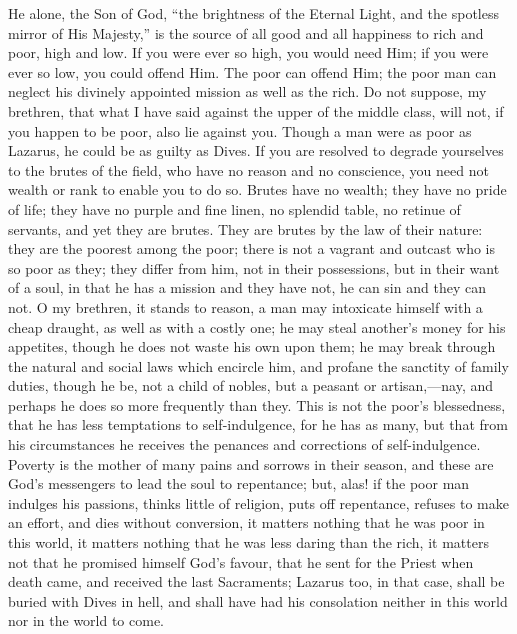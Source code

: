He alone, the Son of God, ``the brightness of the Eternal
Light, and the spotless mirror of His Majesty,'' is the source of
all good and all happiness to rich and poor, high and low. If you were
ever so high, you would need Him; if you were ever so low, you could
offend Him. The poor can offend Him; the poor man can neglect his
divinely appointed mission as well as the rich. Do not suppose, my
brethren, that what I have said against the upper of the middle class,
will not, if you happen to be poor, also lie against you. Though a man
were as poor as Lazarus, he could be as guilty as Dives. If you are
resolved to degrade yourselves to the brutes of the field, who have no
reason and no conscience, you need not wealth or rank to enable you to
do so. Brutes have no wealth; they have no pride of life; they have no
purple and fine linen, no splendid table, no retinue of servants, and
yet they are brutes. They are brutes by the law of their nature: they
are the poorest among the poor; there is not a vagrant and outcast who
is so poor as they; they differ from him, not in their possessions,
but in their want of a soul, in that he has a mission and they have
not, he can sin and they can not. O my brethren, it stands to reason,
a man may intoxicate himself with a cheap draught, as well as with a
costly one; he may steal another's money for his appetites, though he
does not waste his own upon them; he may break through the natural and
social laws which encircle him, and profane the sanctity of family
duties, though he be, not a child of nobles, but a peasant or artisan,—nay,
and perhaps he does so more frequently than they. This is not the
poor's blessedness, that he has less temptations to self-indulgence,
for he has as many, but that from his circumstances he receives the
penances and corrections of self-indulgence. Poverty is the mother of
many pains and sorrows in their season, and these are God's messengers
to lead the soul to repentance; but, alas! if the poor man indulges
his passions, thinks little of religion, puts off repentance, refuses
to make an effort, and dies without conversion, it matters nothing
that he was poor in this world, it matters nothing that he was less
daring than the rich, it matters not that he promised himself God's
favour, that he sent for the Priest when death came, and received the
last Sacraments; Lazarus too, in that case, shall be buried with Dives
in hell, and shall have had his consolation neither in this world nor
in the world to come.

